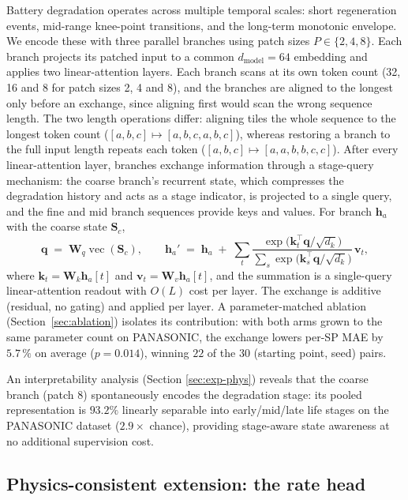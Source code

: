 \documentclass[final,5p,times,twocolumn]{elsarticle}
\begin{document}
Battery degradation operates across multiple temporal scales: short
regeneration events, mid-range knee-point transitions, and the
long-term monotonic envelope. We encode these with three parallel
branches using patch sizes $P \in \{2,4,8\}$. Each branch projects its
patched input to a common $d_{\text{model}}=64$ embedding and applies
two linear-attention layers. Each branch scans at its own token count (32, 16 and
8 for patch sizes 2, 4 and 8), and the branches are aligned to the
longest only before an exchange, since aligning first would scan the
wrong sequence length. The two length operations differ: aligning tiles
the whole sequence to the longest token count
($[a,b,c]\mapsto[a,b,c,a,b,c]$), whereas restoring a branch to the full
input length repeats each token ($[a,b,c]\mapsto[a,a,b,b,c,c]$).
After every linear-attention layer, branches exchange
information through a stage-query mechanism: the coarse branch's
recurrent state, which compresses the degradation history and acts as a
stage indicator, is projected to a single query, and the fine and
mid branch sequences provide keys and values. For branch
$\mathbf{h}_a$ with the coarse state $\mathbf{S}_c$,
\begin{equation}
\label{eq:stagequery}
\mathbf{q} \;=\; \mathbf{W}_q \operatorname{vec}(\mathbf{S}_c),
\qquad
\mathbf{h}_a' \;=\; \mathbf{h}_a \;+\;
\sum_{t} \frac{\exp\!\big(\mathbf{k}_t^{\top}\mathbf{q}/\sqrt{d_k}\big)}
{\sum_{s} \exp\!\big(\mathbf{k}_s^{\top}\mathbf{q}/\sqrt{d_k}\big)}
\,\mathbf{v}_t,
\end{equation}
where $\mathbf{k}_t = \mathbf{W}_k \mathbf{h}_a[t]$ and
$\mathbf{v}_t = \mathbf{W}_v \mathbf{h}_a[t]$, and the summation is a
single-query linear-attention readout with $O(L)$ cost per layer.
The exchange is additive (residual, no gating) and applied
per layer. A parameter-matched ablation
(Section~\ref{sec:ablation}) isolates its contribution: with both arms
grown to the same parameter count on PANASONIC, the exchange lowers
per-SP MAE by $5.7\,\%$ on average ($p=0.014$), winning $22$ of the $30$
(starting point, seed) pairs.

An interpretability analysis (Section \ref{sec:exp-phys}) reveals that
the coarse branch (patch 8) spontaneously encodes the degradation
stage: its pooled representation is $93.2\%$ linearly separable into
early/mid/late life stages on the PANASONIC dataset ($2.9\times$
chance), providing stage-aware state awareness at no additional
supervision cost.

\subsection{Physics-consistent extension: the rate head}
\label{sec:rate-head}
\end{document}

